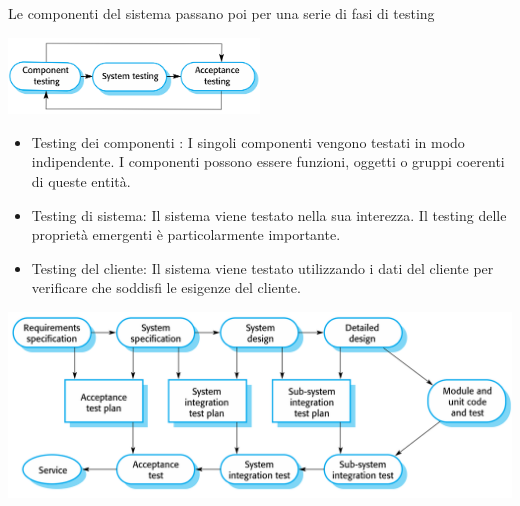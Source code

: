 \documentclass[10pt, letterpaper]{report}
\begin{document}
Le componenti del sistema passano poi per una serie di fasi di testing\begin{center}
    \includegraphics[width=0.5\textwidth ]{images/stageTesting.png}
\end{center}\begin{itemize}
    \item Testing dei componenti :
    I singoli componenti vengono testati in modo indipendente.
    I componenti possono essere funzioni, oggetti o gruppi coerenti di queste entità.
    \item Testing di sistema:
    Il sistema viene testato nella sua interezza. Il testing delle proprietà emergenti è particolarmente importante.
    \item Testing del cliente:
    Il sistema viene testato utilizzando i dati del cliente per verificare che soddisfi le esigenze del cliente.
\end{itemize}\begin{center}
    \includegraphics[width=1\textwidth ]{images/Testingphases.png}
\end{center}
\end{document}
